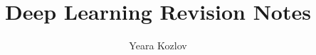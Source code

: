 \documentclass[10pt,landscape,twocolumn]{article}
\begin{document}

\title{Deep Learning Revision Notes}
\author{Yeara Kozlov}
\date{}

\maketitle


\tableofcontents
\clearemptydoublepage





\setcounter{page}{1}

% 

% 
% 
% 
% 





%


% 

\end{document}
